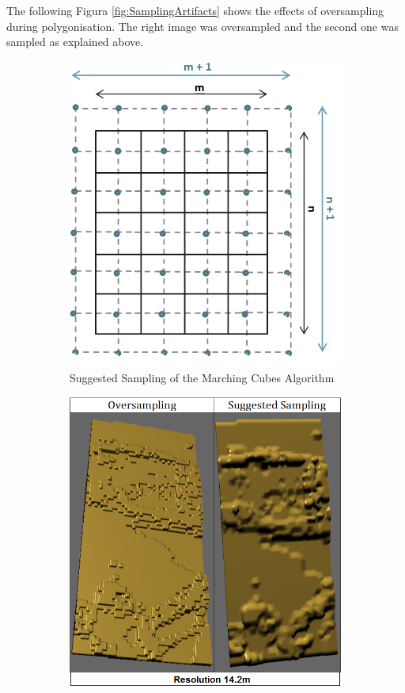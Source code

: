 \documentclass{subfiles}
\begin{document}
\par The following Figura \ref{fig:SamplingArtifacts} shows the effects of oversampling during polygonisation. The right image was oversampled and the second one was sampled as explained above.

    \begin{figure} [h!]
    	\begin{subfigure}[t]{.49\textwidth}
    		
    		\centering
    		\includegraphics[width=.9\textwidth]{img/Sampling}
    		\caption{Suggested Sampling of the Marching Cubes Algorithm}
    		\label{fig:ExpectedSampling}
    	\end{subfigure} \hfill
    	\begin{subfigure}[t]{.49\textwidth}
    		\centering
    		\includegraphics[width=.9\textwidth]{img/OversamplingVsSuggestedSampling}

\end{subfigure}
\end{figure}
\end{document}
